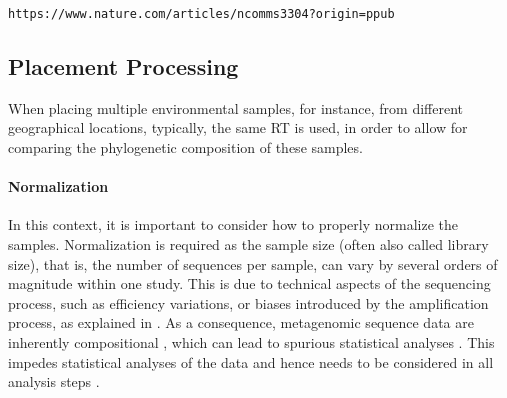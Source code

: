  \verb|https://www.nature.com/articles/ncomms3304?origin=ppub|



\subsection{Placement Processing}
\label{ch:Foundations:sec:PhylogeneticPlacement:sub:PlacementProcessing}

When placing multiple environmental samples, for instance, from different geographical locations,
typically, the same \ac{RT} is used, in order to allow for comparing the phylogenetic composition of these samples.

\paragraph{Normalization}
\label{ch:Foundations:sec:PhylogeneticPlacement:sub:PlacementProcessing:par:Normalization}

In this context, it is important to consider how to properly normalize the samples.
Normalization is required as the sample size (often also called library size),
that is, the number of sequences per sample, can vary by several orders of magnitude within one study.
This is due to technical aspects of the sequencing process, such as efficiency variations,
or biases introduced by the amplification process,
as explained in .
As a consequence, metagenomic sequence data are inherently compositional \cite{Gloor2017,Quinn2018},
which can lead to spurious statistical analyses \cite{Aitchison1986,Jackson1997,Tsilimigras2016,Gloor2016a}.
This impedes statistical analyses of the data and hence needs to be considered in all analysis steps \cite{Silverman2017,Quinn2018}.

